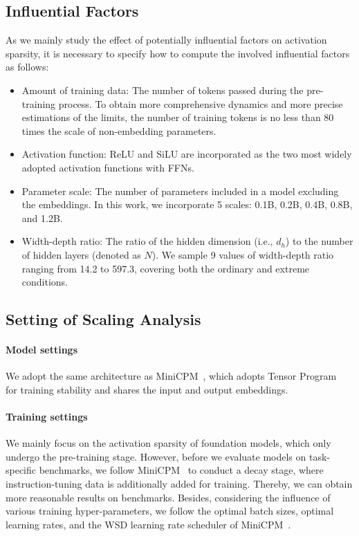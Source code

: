 \documentclass{article} %
\begin{document}
\subsection{Influential Factors}

As we mainly study the effect of potentially influential factors on activation sparsity, it is necessary to specify how to compute the involved influential factors as follows:

\begin{itemize}
    \item Amount of training data: The number of tokens passed during the pre-training process. To obtain more comprehensive dynamics and more precise estimations of the limits, the number of training tokens is no less than 80 times the scale of non-embedding parameters.
    \item Activation function: ReLU and SiLU are incorporated as the two most widely adopted activation functions with FFNs.
    \item Parameter scale: The number of parameters included in a model excluding the embeddings. In this work, we incorporate 5 scales: 0.1B, 0.2B, 0.4B, 0.8B, and 1.2B.
    \item Width-depth ratio: The ratio of the hidden dimension (i.e., $d_h$) to the number of hidden layers (denoted as $N$). We sample 9 values of width-depth ratio ranging from 14.2 to 597.3, covering both the ordinary and extreme conditions.
\end{itemize}

\subsection{Setting of Scaling Analysis} \label{sec:setting-scaling}

\paragraph{Model settings} We adopt the same architecture as MiniCPM~\citep{hu2024minicpm}, which adopts Tensor Program~\citep{yang2022tensor} for training stability and shares the input and output embeddings.

\paragraph{Training settings} We mainly focus on the activation sparsity of foundation models, which only undergo the pre-training stage. However, before we evaluate models on task-specific benchmarks, we follow MiniCPM~\citep{hu2024minicpm} to conduct a decay stage, where instruction-tuning data is additionally added for training. Thereby, we can obtain more reasonable results on benchmarks.
Besides, considering the influence of various training hyper-parameters, we follow the optimal batch sizes, optimal learning rates, and the WSD learning rate scheduler of MiniCPM~\citep{hu2024minicpm}.
\end{document}
